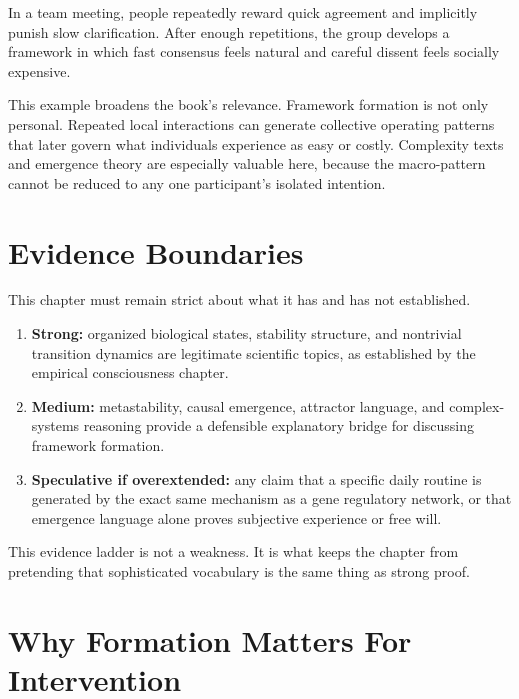 \begin{example}
In a team meeting, people repeatedly reward quick agreement and implicitly
punish slow clarification. After enough repetitions, the group develops a
framework in which fast consensus feels natural and careful dissent feels
socially expensive.
\end{example}

\begin{discussion}
This example broadens the book's relevance. Framework formation is not only
personal. Repeated local interactions can generate collective operating
patterns that later govern what individuals experience as easy or costly.
Complexity texts and emergence theory are especially valuable here, because the
macro-pattern cannot be reduced to any one participant's isolated intention.
\end{discussion}

\section{Evidence Boundaries}

This chapter must remain strict about what it has and has not established.

\begin{enumerate}[nosep]
  \item \textbf{Strong:} organized biological states, stability structure, and
        nontrivial transition dynamics are legitimate scientific topics, as
        established by the empirical consciousness chapter.
  \item \textbf{Medium:} metastability, causal emergence, attractor language,
        and complex-systems reasoning provide a defensible explanatory bridge
        for discussing framework formation.
  \item \textbf{Speculative if overextended:} any claim that a specific daily
        routine is generated by the exact same mechanism as a gene regulatory
        network, or that emergence language alone proves subjective experience
        or free will.
\end{enumerate}

\begin{remark}
This evidence ladder is not a weakness. It is what keeps the chapter from
pretending that sophisticated vocabulary is the same thing as strong proof.
\end{remark}

\section{Why Formation Matters For Intervention}

